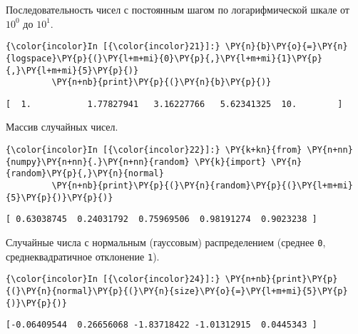     Последовательность чисел с постоянным шагом по логарифмической шкале от
\(10^0\) до \(10^1\).

    \begin{Verbatim}[commandchars=\\\{\}]
{\color{incolor}In [{\color{incolor}21}]:} \PY{n}{b}\PY{o}{=}\PY{n}{logspace}\PY{p}{(}\PY{l+m+mi}{0}\PY{p}{,}\PY{l+m+mi}{1}\PY{p}{,}\PY{l+m+mi}{5}\PY{p}{)}
         \PY{n+nb}{print}\PY{p}{(}\PY{n}{b}\PY{p}{)}
\end{Verbatim}

    \begin{Verbatim}[commandchars=\\\{\}]
[  1.           1.77827941   3.16227766   5.62341325  10.        ]

    \end{Verbatim}

    Массив случайных чисел.

    \begin{Verbatim}[commandchars=\\\{\}]
{\color{incolor}In [{\color{incolor}22}]:} \PY{k+kn}{from} \PY{n+nn}{numpy}\PY{n+nn}{.}\PY{n+nn}{random} \PY{k}{import} \PY{n}{random}\PY{p}{,}\PY{n}{normal}
         \PY{n+nb}{print}\PY{p}{(}\PY{n}{random}\PY{p}{(}\PY{l+m+mi}{5}\PY{p}{)}\PY{p}{)}
\end{Verbatim}

    \begin{Verbatim}[commandchars=\\\{\}]
[ 0.63038745  0.24031792  0.75969506  0.98191274  0.9023238 ]

    \end{Verbatim}

    Случайные числа с нормальным (гауссовым) распределением (среднее
\texttt{0}, среднеквадратичное отклонение \texttt{1}).

    \begin{Verbatim}[commandchars=\\\{\}]
{\color{incolor}In [{\color{incolor}24}]:} \PY{n+nb}{print}\PY{p}{(}\PY{n}{normal}\PY{p}{(}\PY{n}{size}\PY{o}{=}\PY{l+m+mi}{5}\PY{p}{)}\PY{p}{)}
\end{Verbatim}

    \begin{Verbatim}[commandchars=\\\{\}]
[-0.06409544  0.26656068 -1.83718422 -1.01312915  0.0445343 ]

    \end{Verbatim}

